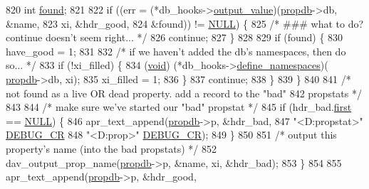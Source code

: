 \begin{DoxyCode}
820             \textcolor{keywordtype}{int} \hyperlink{pcregrep_8txt_a1fdac88190c7a3aca2735f0bf49094dd}{found};
821 
822             \textcolor{keywordflow}{if} ((err = (*db\_hooks->\hyperlink{structdav__hooks__propdb_a203b6da3e9f82c0e3158461bf1a50b8d}{output\_value})(\hyperlink{group__MOD__DAV_gac428117c2c7c0121d6e49a52085fd196}{propdb}->db, &name,
823                                                  xi, &hdr\_good,
824                                                  &found)) != \hyperlink{pcre_8txt_ad7f989d16aa8ca809a36bc392c07fba1}{NULL}) \{
825                 \textcolor{comment}{/* ### what to do? continue doesn't seem right... */}
826                 \textcolor{keywordflow}{continue};
827             \}
828 
829             \textcolor{keywordflow}{if} (found) \{
830                 have\_good = 1;
831 
832                 \textcolor{comment}{/* if we haven't added the db's namespaces, then do so... */}
833                 \textcolor{keywordflow}{if} (!xi\_filled) \{
834                     (\hyperlink{group__MOD__ISAPI_gacd6cdbf73df3d9eed42fa493d9b621a6}{void}) (*db\_hooks->\hyperlink{structdav__hooks__propdb_ab54e309d9a5269e3bb3bd42a2198d42c}{define\_namespaces})(
      \hyperlink{group__MOD__DAV_gac428117c2c7c0121d6e49a52085fd196}{propdb}->db, xi);
835                     xi\_filled = 1;
836                 \}
837                 \textcolor{keywordflow}{continue};
838             \}
839         \}
840 
841         \textcolor{comment}{/* not found as a live OR dead property. add a record to the "bad"}
842 \textcolor{comment}{           propstats */}
843 
844         \textcolor{comment}{/* make sure we've started our "bad" propstat */}
845         \textcolor{keywordflow}{if} (hdr\_bad.\hyperlink{structapr__text__header_a6db03d272f5e56058c84e10e49624c0b}{first} == \hyperlink{pcre_8txt_ad7f989d16aa8ca809a36bc392c07fba1}{NULL}) \{
846             apr\_text\_append(\hyperlink{group__MOD__DAV_gac428117c2c7c0121d6e49a52085fd196}{propdb}->p, &hdr\_bad,
847                             \textcolor{stringliteral}{"<D:propstat>"} \hyperlink{group__MOD__DAV_ga5a242a2983fe78462523e34b6d6e3628}{DEBUG\_CR}
848                             \textcolor{stringliteral}{"<D:prop>"} \hyperlink{group__MOD__DAV_ga5a242a2983fe78462523e34b6d6e3628}{DEBUG\_CR});
849         \}
850 
851         \textcolor{comment}{/* output this property's name (into the bad propstats) */}
852         dav\_output\_prop\_name(\hyperlink{group__MOD__DAV_gac428117c2c7c0121d6e49a52085fd196}{propdb}->p, &name, xi, &hdr\_bad);
853     \}
854 
855     apr\_text\_append(\hyperlink{group__MOD__DAV_gac428117c2c7c0121d6e49a52085fd196}{propdb}->p, &hdr\_good,

\end{DoxyCode}
